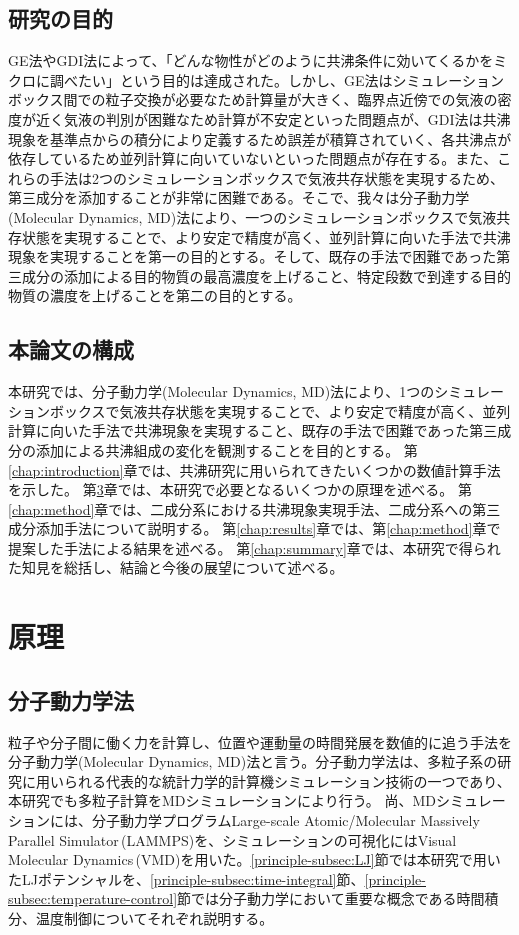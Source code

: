 \documentclass[titlepage]{jsreport}
\begin{document}
\section{研究の目的} \label{introduction:purpose}
GE法やGDI法によって、「どんな物性がどのように共沸条件に効いてくるかをミクロに調べたい」という目的は達成された。しかし、GE法はシミュレーションボックス間での粒子交換が必要なため計算量が大きく、臨界点近傍での気液の密度が近く気液の判別が困難なため計算が不安定といった問題点が、GDI法は共沸現象を基準点からの積分により定義するため誤差が積算されていく、各共沸点が依存しているため並列計算に向いていないといった問題点が存在する。また、これらの手法は2つのシミュレーションボックスで気液共存状態を実現するため、第三成分を添加することが非常に困難である。そこで、我々は分子動力学(Molecular Dynamics, MD)法\cite{molecular-dynamics}により、一つのシミュレーションボックスで気液共存状態を実現することで、より安定で精度が高く、並列計算に向いた手法で共沸現象を実現することを第一の目的とする。そして、既存の手法で困難であった第三成分の添加による目的物質の最高濃度を上げること、特定段数で到達する目的物質の濃度を上げることを第二の目的とする。


\section{本論文の構成} \label{introduction:constitution}
本研究では、分子動力学(Molecular Dynamics, MD)法により、1つのシミュレーションボックスで気液共存状態を実現することで、より安定で精度が高く、並列計算に向いた手法で共沸現象を実現すること、既存の手法で困難であった第三成分の添加による共沸組成の変化を観測することを目的とする。
第\ref{chap:introduction}章では、共沸研究に用いられてきたいくつかの数値計算手法を示した。
第\ref{chap:principle}章では、本研究で必要となるいくつかの原理を述べる。
第\ref{chap:method}章では、二成分系における共沸現象実現手法、二成分系への第三成分添加手法について説明する。
第\ref{chap:results}章では、第\ref{chap:method}章で提案した手法による結果を述べる。
第\ref{chap:summary}章では、本研究で得られた知見を総括し、結論と今後の展望について述べる。


\chapter{原理} \label{chap:principle}
\section{分子動力学法}\label{principle-sec:molecular-dynamics}
粒子や分子間に働く力を計算し、位置や運動量の時間発展を数値的に追う手法を分子動力学(Molecular Dynamics, MD)法と言う。分子動力学法は、多粒子系の研究に用いられる代表的な統計力学的計算機シミュレーション技術の一つであり\cite{molecular-dynamics-many-molecules}、本研究でも多粒子計算をMDシミュレーションにより行う。
尚、MDシミュレーションには、分子動力学プログラムLarge-scale Atomic/Molecular Massively Parallel Simulator\,(LAMMPS)\cite{lammps}を、シミュレーションの可視化にはVisual Molecular Dynamics\,(VMD)\cite{vmd}を用いた。\ref{principle-subsec:LJ}節では本研究で用いたLJポテンシャルを、\ref{principle-subsec:time-integral}節、\ref{principle-subsec:temperature-control}節では分子動力学において重要な概念である時間積分、温度制御についてそれぞれ説明する。
\end{document}
